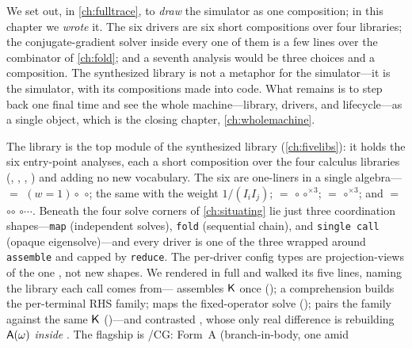 We set out, in \cref{ch:fulltrace}, to \emph{draw} the simulator as one composition;
in this chapter we \emph{wrote} it. The six drivers are six short compositions over
four libraries; the conjugate-gradient solver inside every one of them is a few lines
over the combinator of \cref{ch:fold}; and a seventh analysis would be three choices
and a composition. The synthesized library is not a metaphor for the simulator---it is
the simulator, with its compositions made into code. What remains is to step back one
final time and see the whole machine---library, drivers, and lifecycle---as a single
object, which is the closing chapter, \cref{ch:wholemachine}.

\summarysection
The  library is the top module of the synthesized library
(\cref{ch:fivelibs}): it holds the six entry-point analyses, each a short composition
over the four calculus libraries (, , ,
) and adding no new vocabulary. The six are one-liners in a single
algebra--- $=$ $(w{=}1)\circ$\allowbreak%
$\circ$\allowbreak{};  the same with the
weight $1/(I_iI_j)$;  $=$ $\circ$\allowbreak%
$\circ$\allowbreak{}$^{\times3}$;  $=$
$\circ$\allowbreak{}$^{\times3}$;  and
 $=$ $\circ$\allowbreak{}$\circ$\allowbreak%
$\circ\cdots$. Beneath the four solve corners of \cref{ch:situating}
lie just three coordination shapes---\texttt{map} (independent solves), \texttt{fold}
(sequential chain), and \texttt{single call} (opaque eigensolve)---and every driver is
one of the three wrapped around \texttt{assemble} and capped by \texttt{reduce}. The
per-driver config types are projection-views of the one , not new shapes.
We rendered  in full and walked its five lines, naming the library
each call comes from--- assembles $\mathsf{K}$ once ();
a comprehension builds the per-terminal RHS family;  maps the
fixed-operator solve ();  pairs the family
against the same $\mathsf{K}$ ()---and contrasted , whose only
real difference is rebuilding $\mathsf{A}(\omega)$ \emph{inside} .
The flagship is /CG: Form~A (branch-in-body, one  amid
